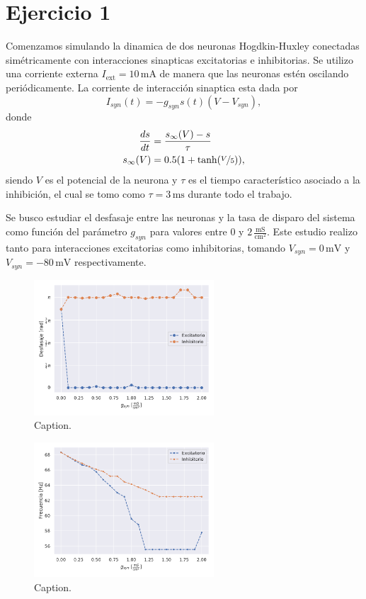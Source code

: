 \section*{Ejercicio 1}
\graphicspath{{Figuras/ej_01/}}

Comenzamos simulando la dinamica de dos neuronas Hogdkin-Huxley \cite{HH} conectadas simétricamente con interacciones sinapticas excitatorias e inhibitorias. Se utilizo una corriente externa $I_{\text{ext}}=10\,\text{mA}$ de manera que las neuronas estén oscilando periódicamente. La corriente de interacción sinaptica esta dada por
\begin{equation}
    I_{syn}(t) = -g_{syn} s(t) (V-V_{syn}),
\end{equation}
donde
\begin{align}
    \frac{ds}{dt}&= \frac{s_\infty(V) - s}{\tau}\\
    s_\infty(V)&= 0.5(1+\text{tanh}(\nicefrac{V}{5})),
\end{align}
siendo $V$ es el potencial de  la neurona y $\tau$ es el tiempo característico asociado a la inhibición, el cual se tomo como $\tau = 3\,\text{ms}$ durante todo el trabajo.

Se busco estudiar el desfasaje entre las neuronas y la tasa de disparo del sistema como función del parámetro $g_{syn}$ para valores entre $0$ y $2\,\frac{\text{mS}}{\text{cm}^2}$. Este estudio realizo tanto para interacciones excitatorias como inhibitorias, tomando $V_{syn}=0\,\text{mV}$ y $V_{syn}=-80\,\text{mV}$ respectivamente.


\begin{figure}[h!]
    \centering
    \includegraphics[width=0.6\textwidth]{Desfasaje.pdf}
    \caption{Caption.}
    \label{ej01:Desfasaje}
\end{figure}

\begin{figure}[h!]
    \centering
    \includegraphics[width=0.6\textwidth]{Tasa_de_Disparo.pdf}
    \caption{Caption.}
    \label{ej01:tasaDeDisparo}
\end{figure}

